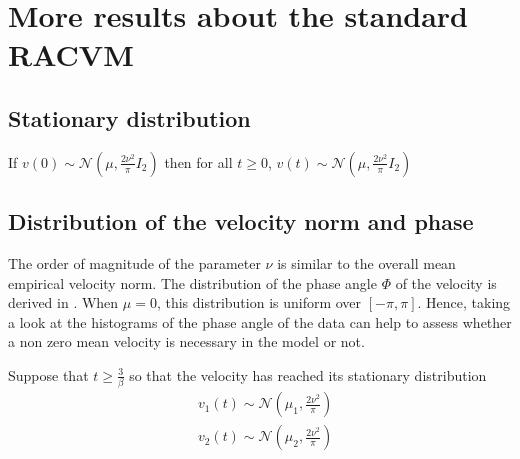 \documentclass[11pt]{article}
\newcommand {\1}{\mathbb{1}}
\theoremstyle{definition}
\theoremstyle{remark}
\theoremstyle{remark}
\begin{document}
\section{More results about the standard RACVM}
\subsection{Stationary distribution}

If $v(0) \sim \mathcal{N}\left(\mu,\frac{2\nu^2}{\pi} I_2\right)$ then for all $t \geq 0$, $v(t) \sim \mathcal{N}\left(\mu,\frac{2\nu^2}{\pi} I_2\right)$

\subsection{Distribution of the velocity norm and phase}
 The order of magnitude of the parameter $\nu$ is similar to the overall mean empirical velocity norm. The distribution of the phase angle $\Phi$ of the velocity is derived in \cite{pawula_distribution_1982}.
When $\mu=0$, this distribution is uniform over $[-\pi,\pi]$. Hence, taking a look at the histograms of the phase angle of the data can help to assess whether a non zero mean velocity is necessary in the model or not.

Suppose that $t\geq \frac{3}{\beta}$ so that the velocity has reached its stationary distribution
\begin{align*}
	&v_1(t) \sim \mathcal{N}\left(\mu_1, \frac{2\nu^2}{\pi}\right) \\
	&v_2(t) \sim \mathcal{N}\left(\mu_2, \frac{2\nu^2}{\pi}\right)
\end{align*}
\end{document}
